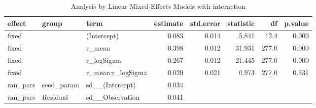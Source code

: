\begin{table}[ht]
\centering
\caption{Analysis by Linear Mixed-Effects Models with interaction} 
\label{Stbl_lmer1}
\begingroup\small
\begin{tabular}{lllrrrrr}
  \toprule
effect & group & term & estimate & std.error & statistic & df & p.value \\ 
  \midrule
fixed &  & (Intercept) & 0.083 & 0.014 & 5.841 & 12.4 & 0.000 \\ 
  fixed &  & r\_mean & 0.398 & 0.012 & 31.931 & 277.0 & 0.000 \\ 
  fixed &  & r\_logSigma & 0.267 & 0.012 & 21.445 & 277.0 & 0.000 \\ 
  fixed &  & r\_mean:r\_logSigma & 0.020 & 0.021 & 0.973 & 277.0 & 0.331 \\ 
  ran\_pars & seed\_param & sd\_\_(Intercept) & 0.034 &  &  &  &  \\ 
  ran\_pars & Residual & sd\_\_Observation & 0.041 &  &  &  &  \\ 
   \bottomrule
\end{tabular}
\endgroup
\end{table}
